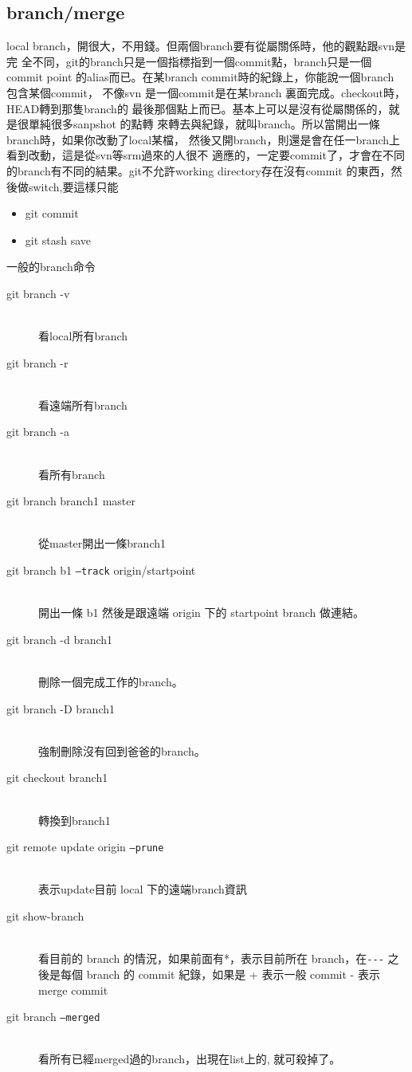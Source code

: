   \subsection{branch/merge}
  local branch，開很大，不用錢。但兩個branch要有從屬關係時，他的觀點跟svn是完
  全不同，git的branch只是一個指標指到一個commit點，branch只是一個commit point
  的alias而已。在某branch commit時的紀錄上，你能說一個branch 包含某個commit，
  不像svn 是一個commit是在某branch 裏面完成。checkout時，HEAD轉到那隻branch的
  最後那個點上而已。基本上可以是沒有從屬關係的，就是很單純很多sanpshot 的點轉
  來轉去與紀錄，就叫branch。所以當開出一條branch時，如果你改動了local某檔，
  然後又開branch，則還是會在任一branch上看到改動，這是從svn等srm過來的人很不
  適應的，一定要commit了，才會在不同的branch有不同的結果。git不允許working 
  directory存在沒有commit 的東西，然後做switch,要這樣只能
  \begin{itemize}
    \item git commit
    \item git stash save
  \end{itemize}
  一般的branch命令
  \begin{description}
    \item [git branch -v] \hfill \\
      看local所有branch
    \item [git branch -r] \hfill \\
      看遠端所有branch
    \item [git branch -a] \hfill \\
      看所有branch
    \item [git branch branch1 master] \hfill \\
      從master開出一條branch1
    \item [git branch b1 \texttt{--track} origin/startpoint] \hfill \\
      開出一條 b1 然後是跟遠端 origin 下的 startpoint branch 做連結。
    \item [git branch -d branch1] \hfill \\
      刪除一個完成工作的branch。
    \item [git branch -D branch1] \hfill \\
      強制刪除沒有回到爸爸的branch。
    \item [git checkout branch1] \hfill \\
      轉換到branch1
    \item [git remote update origin \texttt{--prune}] \hfill \\
      表示update目前 local 下的遠端branch資訊
    \item [git show-branch] \hfill \\
      看目前的 branch 的情況，如果前面有*，表示目前所在 branch，在\verb=---=
      之後是每個  branch 的 commit 紀錄，如果是 + 表示一般 commit - 表示 merge
      commit
    \item [git branch \texttt{--merged}] \hfill \\
      看所有已經merged過的branch，出現在list上的, 就可殺掉了。
  \end{description}

